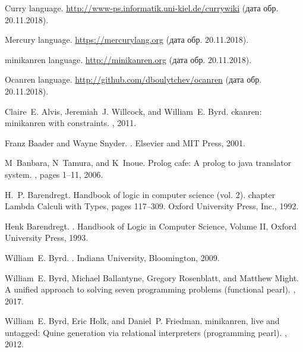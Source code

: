 %
%
\begin{thebibliography}{10}

Curry language.
 \newblock \url{http://www-ps.informatik.uni-kiel.de/currywiki}
 \newblock (дата обр. 20.11.2018).

Mercury language.
\newblock \url{https://mercurylang.org}
\newblock (дата обр. 20.11.2018).

minikanren language.
\newblock \url{http://minikanren.org}
\newblock (дата обр. 20.11.2018).

Ocanren language.
\newblock \url{http://github.com/dboulytchev/ocanren}
\newblock (дата обр. 20.11.2018).

Claire~E. Alvis, Jeremiah~J. Willcock, and William~E. Byrd.
\newblock ckanren: minikanren with constraints.
, 2011.

Franz Baader and Wayne Snyder.
.
\newblock Elsevier and MIT Press, 2001.

M~Banbara, N~Tamura, and K~Inoue.
\newblock Prolog cafe: A prolog to java translator system.
, pages 1--11,
  2006.

H.~P. Barendregt.
\newblock Handbook of logic in computer science (vol. 2).
\newblock chapter Lambda Calculi with Types, pages 117--309. Oxford University
  Press, Inc., 1992.

Henk Barendregt.
.
\newblock Handbook of Logic in Computer Science, Volume II, Oxford University
  Press, 1993.

William~E. Byrd.
.
\newblock Indiana University, Bloomington, 2009.

William~E. Byrd, Michael Ballantyne, Gregory Rosenblatt, and Matthew Might.
\newblock A unified approach to solving seven programming problems (functional
  pearl).
, 2017.

William~E. Byrd, Eric Holk, and Daniel~P. Friedman.
\newblock minikanren, live and untagged: Quine generation via relational
  interpreters (programming pearl).
, 2012.


\end{thebibliography}
